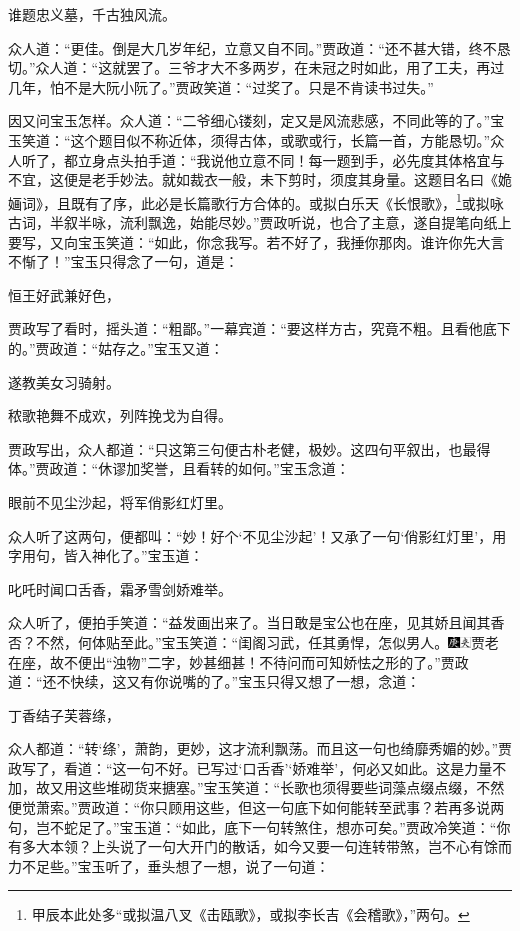 谁题忠义墓，千古独风流。

众人道：“更佳。倒是大几岁年纪，立意又自不同。”贾政道：“还不甚大错，终不恳切。”众人道：“这就罢了。三爷才大不多两岁，在未冠之时如此，用了工夫，再过几年，怕不是大阮小阮了。”贾政笑道：“过奖了。只是不肯读书过失。”

因又问宝玉怎样。众人道：“二爷细心镂刻，定又是风流悲感，不同此等的了。”宝玉笑道：“这个题目似不称近体，须得古体，或歌或行，长篇一首，方能恳切。”众人听了，都立身点头拍手道：“我说他立意不同！每一题到手，必先度其体格宜与不宜，这便是老手妙法。就如裁衣一般，未下剪时，须度其身量。这题目名曰《姽婳词》，且既有了序，此必是长篇歌行方合体的。或拟白乐天《长恨歌》，\footnote{甲辰本此处多“或拟温八叉《击瓯歌》，或拟李长吉《会稽歌》，”两句。}或拟咏古词，半叙半咏，流利飘逸，始能尽妙。”贾政听说，也合了主意，遂自提笔向纸上要写，又向宝玉笑道：“如此，你念我写。若不好了，我捶你那肉。谁许你先大言不惭了！”宝玉只得念了一句，道是：

恒王好武兼好色，

贾政写了看时，摇头道：“粗鄙。”一幕宾道：“要这样方古，究竟不粗。且看他底下的。”贾政道：“姑存之。”宝玉又道：

遂教美女习骑射。

秾歌艳舞不成欢，列阵挽戈为自得。

贾政写出，众人都道：“只这第三句便古朴老健，极妙。这四句平叙出，也最得体。”贾政道：“休谬加奖誉，且看转的如何。”宝玉念道：

眼前不见尘沙起，将军俏影红灯里。

众人听了这两句，便都叫：“妙！好个‘不见尘沙起’！又承了一句‘俏影红灯里’，用字用句，皆入神化了。”宝玉道：

叱吒时闻口舌香，霜矛雪剑娇难举。

众人听了，便拍手笑道：“益发画出来了。当日敢是宝公也在座，见其娇且闻其香否？不然，何体贴至此。”宝玉笑道：“闺阁习武，任其勇悍，怎似男人。{\includegraphics[width=3mm]{../Images/00004}\includegraphics[width=3mm]{../Images/00012}\footnotesize \kaishu 贾老在座，故不便出“浊物”二字，妙甚细甚！}不待问而可知娇怯之形的了。”贾政道：“还不快续，这又有你说嘴的了。”宝玉只得又想了一想，念道：

丁香结子芙蓉绦，

众人都道：“转‘绦’，萧韵，更妙，这才流利飘荡。而且这一句也绮靡秀媚的妙。”贾政写了，看道：“这一句不好。已写过‘口舌香’‘娇难举’，何必又如此。这是力量不加，故又用这些堆砌货来搪塞。”宝玉笑道：“长歌也须得要些词藻点缀点缀，不然便觉萧索。”贾政道：“你只顾用这些，但这一句底下如何能转至武事？若再多说两句，岂不蛇足了。”宝玉道：“如此，底下一句转煞住，想亦可矣。”贾政冷笑道：“你有多大本领？上头说了一句大开门的散话，如今又要一句连转带煞，岂不心有馀而力不足些。”宝玉听了，垂头想了一想，说了一句道：

